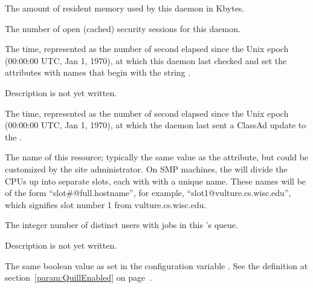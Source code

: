 \begin{description}
\item[\AdAttr{MonitorSelfResidentSetSize}:] The amount of resident memory
  used by this daemon in Kbytes.

\item[\AdAttr{MonitorSelfSecuritySessions}:] The number of open (cached)
  security sessions for this daemon.

\item[\AdAttr{MonitorSelfTime}:] The  time, represented as the number of
  second elapsed since the Unix epoch (00:00:00 UTC, Jan 1, 1970),
  at which this daemon last checked and set the attributes with names that
  begin with the string .
  
\item[\AdAttr{MyAddress}:] Description is not yet written.

\item[\AdAttr{MyCurrentTime}:]  The time, represented as the number of 
  second elapsed since the Unix epoch (00:00:00 UTC, Jan 1, 1970),
  at which the  daemon last sent a ClassAd update to the
  .

\item[\AdAttr{Name}:] The name of this resource; typically the same value as
  the  attribute, but could be customized by the site
  administrator.
  On SMP machines, the  will divide the CPUs up into separate
  slots, each with with a unique name.
  These names will be of the form ``slot\#@full.hostname'', for example,
  ``slot1@vulture.cs.wisc.edu'', which signifies slot number 1 from
  vulture.cs.wisc.edu.

\item[\AdAttr{NumUsers}:] The integer number of distinct users with jobs in
  this 's queue.

\item[\AdAttr{PublicNetworkIpAddr}:] Description is not yet written.

\item[\AdAttr{QuillEnabled}:] The same boolean value as set in the
  configuration variable .
  See the definition at section~\ref{param:QuillEnabled} on
  page~\pageref{param:QuillEnabled}.


\end{description}
